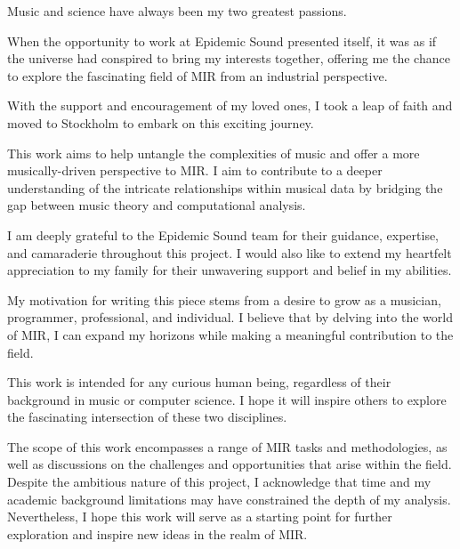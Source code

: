 \begin{preface}

Music and science have always been my two greatest passions. 

When the opportunity to work at Epidemic Sound presented itself, it was as if the universe had conspired to bring my interests together, offering me the chance to explore the fascinating field of MIR from an industrial perspective. 

With the support and encouragement of my loved ones, I took a leap of faith and moved to Stockholm to embark on this exciting journey.

This work aims to help untangle the complexities of music and offer a more musically-driven perspective to MIR. I aim to contribute to a deeper understanding of the intricate relationships within musical data by bridging the gap between music theory and computational analysis.

I am deeply grateful to the Epidemic Sound team for their guidance, expertise, and camaraderie throughout this project. I would also like to extend my heartfelt appreciation to my family for their unwavering support and belief in my abilities.

My motivation for writing this piece stems from a desire to grow as a musician, programmer, professional, and individual. I believe that by delving into the world of MIR, I can expand my horizons while making a meaningful contribution to the field.

This work is intended for any curious human being, regardless of their background in music or computer science. I hope it will inspire others to explore the fascinating intersection of these two disciplines.

The scope of this work encompasses a range of MIR tasks and methodologies, as well as discussions on the challenges and opportunities that arise within the field. Despite the ambitious nature of this project, I acknowledge that time and my academic background limitations may have constrained the depth of my analysis. Nevertheless, I hope this work will serve as a starting point for further exploration and inspire new ideas in the realm of MIR.

\newpage
\end{preface}